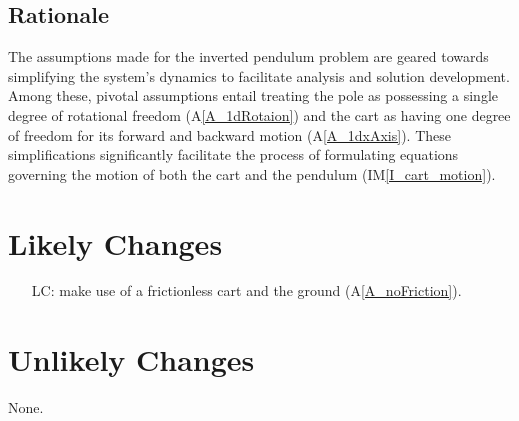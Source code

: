 \documentclass[12pt]{article}
\newcommand{\aref}[1]{A\ref{#1}}
\newcommand{\iref}[1]{IM\ref{#1}}
\newcounter{lcnum} %
\begin{document}
\subsection{Rationale}

The assumptions made for the inverted pendulum problem are geared 
towards simplifying the system's dynamics to facilitate analysis 
and solution development. Among these, pivotal assumptions entail 
treating the pole as possessing a single degree of rotational 
freedom (\aref{A_1dRotaion}) and the cart as having one degree 
of freedom for its forward and backward motion (\aref{A_1dxAxis}).
These simplifications significantly facilitate the process of 
formulating equations governing the motion of both the cart 
and the pendulum (\iref{I_cart_motion}).


\section{Likely Changes} \label{sec:likely_changes}

\noindent \begin{itemize}

\item[LC\refstepcounter{lcnum}\thelcnum\label{LC_friction}:]
    \progname{} make use of a frictionless cart and the ground (\aref{A_noFriction}).

\end{itemize}

\section{Unlikely Changes} \label{sec:unlikely_changes}

None.

\end{document}
